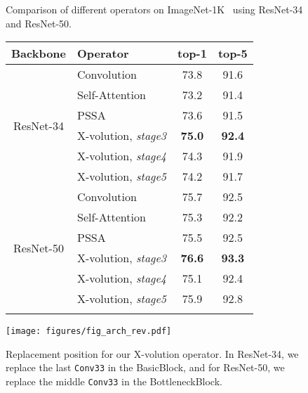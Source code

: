 \documentclass{article}
\begin{document}
\begin{figure}[t]
    \centering
    \small
    \begin{minipage}[t!]{0.47\textwidth}
        \centering
\makeatletter{}\makeatother
        \caption{Comparison of different operators on ImageNet-1K~\cite{DBLP:conf/cvpr/DengDSLL009} using ResNet-34 and ResNet-50.
}
        \begin{spacing}{1.05}
         \small
\setlength\tabcolsep{4.5pt}
                \begin{tabular}{c| l| c| c}
                \Xhline{1.0pt}
        		Backbone &  Operator & top-1 & top-5
        		\\ \hline
        		
        		\multirow{6}{*}{ResNet-34} 
        		& Convolution & 73.8 & 91.6\\ 
                & Self-Attention & 73.2 & 91.4 \\
                & PSSA & 73.6 & 91.5 \\
                \cline{2-4}
        		& X-volution, \textit{stage3} & \textbf{75.0} & \textbf{92.4}  \\
        		& X-volution, \textit{stage4} & 74.3 & 91.9 \\
        		& X-volution, \textit{stage5} & 74.2 & 91.7 \\
        		\hline
        		
        		\multirow{6}{*}{ResNet-50} 
        		& Convolution & 75.7 & 92.5 \\ 
                & Self-Attention & 75.3 & 92.2\\
                & PSSA & 75.5 & 92.5 \\
                \cline{2-4}
        		& X-volution, \textit{stage3} & \textbf{76.6} & \textbf{93.3}\\
        		& X-volution, \textit{stage4} & 75.1 & 92.4\\
        		& X-volution, \textit{stage5} & 75.9 & 92.8\\
                \Xhline{1.0pt}
        \end{tabular}
        
        \label{tab_cls}
        \vspace{-2mm}
        \end{spacing}
    \end{minipage}
    \hspace{5.0mm}
    \begin{minipage}[t!]{0.47\textwidth}
\small
        \texttt{[image: figures/fig\_arch\_rev.pdf]}
        \caption{
        Replacement position for our X-volution operator. In ResNet-34, we replace the last \texttt{Conv33} in the BasicBlock, and for ResNet-50, we replace the middle \texttt{Conv33} in the BottleneckBlock.
        }
        \label{fig:arch}
    \end{minipage}
    \vspace{-2mm}
\end{figure}
\end{document}
